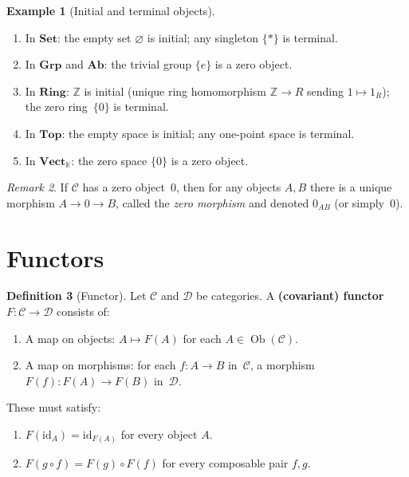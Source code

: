 \documentclass[a4paper,12pt]{book}
\DeclareMathOperator{\Ob}{Ob}
\newcommand{\Set}{\mathbf{Set}}
\newcommand{\Grp}{\mathbf{Grp}}
\newcommand{\Ab}{\mathbf{Ab}}
\newcommand{\Ring}{\mathbf{Ring}}
\newcommand{\Top}{\mathbf{Top}}
\newcommand{\Vect}{\mathbf{Vect}}
\newcommand{\id}{\mathrm{id}}
\newcommand{\Z}{\mathbb{Z}}
\newcommand{\K}{\mathbb{K}}
\theoremstyle{definition}
\newtheorem{definition}{Definition}[section]
\newtheorem{example}[definition]{Example}
\theoremstyle{plain}
\theoremstyle{remark}
\newtheorem{remark}[definition]{Remark}
\begin{document}
\begin{example}[Initial and terminal objects]\label{ex:initial-terminal}
\begin{enumerate}[label=(\roman*)]
    \item In $\Set$: the empty set $\varnothing$ is initial; any
          singleton $\{*\}$ is terminal.
    \item In $\Grp$ and $\Ab$: the trivial group $\{e\}$ is a
          zero object.
    \item In $\Ring$: $\Z$ is initial (unique ring homomorphism
          $\Z\to R$ sending $1\mapsto 1_R$); the zero ring~$\{0\}$
          is terminal.
    \item In $\Top$: the empty space is initial; any one-point space
          is terminal.
    \item In $\Vect_\K$: the zero space $\{0\}$ is a zero object.
\end{enumerate}
\end{example}

\begin{remark}\label{rem:zero-morphism}
If $\mathcal{C}$ has a zero object~$0$, then for any objects $A,B$ there
is a unique morphism $A\to 0\to B$, called the \emph{zero morphism}
and denoted $0_{AB}$ (or simply~$0$).
\end{remark}


\section{Functors}\label{sec:functors}


\begin{definition}[Functor]\label{def:functor}
Let $\mathcal{C}$ and $\mathcal{D}$ be categories.
A \textbf{(covariant) functor} $F\colon\mathcal{C}\to\mathcal{D}$
consists of:
\begin{enumerate}[label=(\roman*)]
    \item A map on objects:
          $A\mapsto F(A)$ for each $A\in\Ob(\mathcal{C})$.
    \item A map on morphisms: for each $f\colon A\to B$ in~$\mathcal{C}$,
          a morphism $F(f)\colon F(A)\to F(B)$ in~$\mathcal{D}$.
\end{enumerate}
These must satisfy:
\begin{enumerate}[label=\textbf{(F\arabic*)}]
    \item $F(\id_A) = \id_{F(A)}$ for every object $A$.
    \item $F(g\circ f) = F(g)\circ F(f)$ for every composable pair
          $f,g$.
\end{enumerate}
\end{definition}
\end{document}
